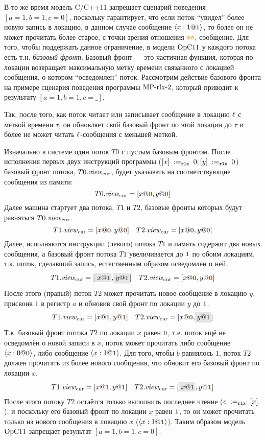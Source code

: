В то же время модель C/C++11 запрещает сценарий поведения $[a = 1, b = 1, c = 0]$, поскольку гарантирует, что если поток
``увидел'' более новую запись в локацию, в данном случае сообщение $\angled{x:1@\tstamp{1}}$,
то более он не может прочитать более старое, с точки зрения отношения $\lMO$, сообщение.
Для того, чтобы поддержать данное ограничение, в модели $\mathrm{OpC11}$ у каждого потока есть т.н. \emph{базовый фронт}.
Базовый фронт --- это частичная функция, которая по локации возвращает максимальную метку времени связанного с локацией сообщения, о
котором ``осведомлен'' поток.
Рассмотрим действие базового фронта на примере сценария поведения программы ${\rm MP\text{-}rlx\text{-}2}$,
который приводит к результату $[a = 1, b = 1, c = \_]$.

Так, после того, как поток читает или записывает сообщение в локацию $\ell$ с меткой времени $\tau$, он обновляет
свой базовый фронт по этой локации до $\tau$ и более не может читать $\ell$-сообщения с меньшей меткой.

Изначально в системе один поток $T0$ с пустым базовым фронтом.
После исполнения первых двух инструкций программы
($[x] \;:=_{\mathtt{rlx}}\;0; [y] \;:=_{\mathtt{rlx}}\;0$) базовый фронт потока, $T0.\mathit{view}_{\mathrm{cur}}$, будет указывать на
соответствующие сообщения из памяти:
\[
T0.\Rcur = [x@\tstamp{0}, y@\tstamp{0}]
\]
Далее машина стартует два потока, $T1$ и $T2$, базовые фронты которых будут равняться $T0.\mathit{view}_{\mathrm{cur}}$.
\[
T1.\Rcur = [x@\tstamp{0}, y@\tstamp{0}] \quad T2.\Rcur = [x@\tstamp{0}, y@\tstamp{0}]
\]
Далее, исполняются инструкции (левого) потока $T1$ и память содержит два новых сообщения,
а базовый фронт потока $T1$ увеличивается до $\tstamp{1}$ по обоим локациям,
т.к. поток, сделавший запись, естественным образом осведомлен о ней.
\[
\begin{array}{l}
T1.\Rcur = [\graybox{x@\tstamp{1}}, \graybox{y@\tstamp{1}}] \quad T2.\Rcur = [x@\tstamp{0}, y@\tstamp{0}]
\end{array}
\]
После этого (правый) поток $T2$ может прочитать новое сообщение в локацию $y$, присвоив $1$ в регистр $a$
и обновив свой фронт по локации $y$ до $\tstamp{1}$.
\[
\begin{array}{l}
T1.\Rcur = [x@\tstamp{1}, y@\tstamp{1}] \quad T2.\Rcur = [x@\tstamp{0}, \graybox{y@\tstamp{1}}]
\end{array}
\]
Т.к. базовый фронт потока $T2$ по локации $x$ равен $\tstamp{0}$, т.е. поток ещё не осведомлён о новой записи в $x$,
поток может прочитать либо сообщение $\angled{x:0@\tstamp{0}}$, либо сообщение $\angled{x:1@\tstamp{1}}$.
Для того, чтобы $b$ равнялось $1$, поток $T2$ должен прочитать из более нового сообщения, что обновит его
базовый фронт по локации $x$.
\[
\begin{array}{l}
T1.\Rcur = [x@\tstamp{1}, y@\tstamp{1}] \quad T2.\Rcur = [\graybox{x@\tstamp{1}}, y@\tstamp{1}]
\end{array}
\]
После этого потоку $T2$ остаётся только выполнить последнее чтение ($c \;:=_{\mathtt{rlx}}\;[x]$),
и поскольку его базовый фронт по локации $x$ равен $\tstamp{1}$, то он может прочитать только
из нового сообщения в локацию $x$ ($\angled{x:1@\tstamp{1}}$).
Таким образом модель $\mathrm{OpC11}$ запрещает результат $[a = 1, b = 1, c = 0]$.

